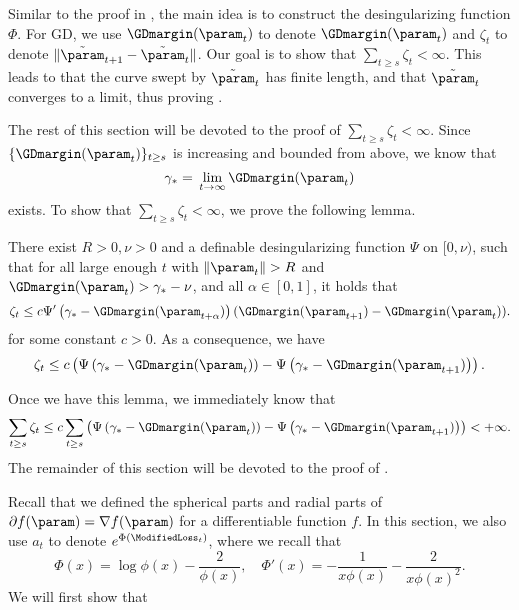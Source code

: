 Similar to the proof in , the main idea is to construct the desingularizing function $\Phi$. For GD, we use $\GDmargin (\param_t)$ to denote $\GDmargin(\param_t)$ and $\zeta_t$ to denote $\|\tilde{\param}_{t+1} - \tilde{\param}_t \|$. Our goal is to show that $\sum_{t\ge s} \zeta_t < \infty$. This leads to that the curve swept by $\tilde{\param}_t$ has finite length, and that $\tilde{\param}_t$ converges to a limit, thus proving .

The rest of this section will be devoted to the proof of $\sum_{t\ge s} \zeta_t < \infty$. Since $\{ \GDmargin(\param_t) \}_{t \ge s}$ is increasing and bounded from above, we know that
\begin{equation*}
    \gamma_* = \, \lim_{t \to \infty} \GDmargin(\param_t)
\end{equation*}
exists. To show that $\sum_{t\ge s} \zeta_t < \infty$, we prove the following lemma. 

\begin{lemma}
\label{lem: Desingularizing function for GD}
There exist $R>0, \nu>0$ and a definable desingularizing function $\Psi$ on $[0, \nu)$, such that for all large enough $t$ with $\left\|\param_t\right\|>R$ and $\GDmargin(\param_t)>\gamma_*-\nu$, and all $\alpha \in [0, 1]$, it holds that
$$
\zeta_t \leq c \Psi^\prime \left(\gamma_*-\GDmargin (\param_{t+\alpha}) \right) (\GDmargin (\param_{t+1}) - \GDmargin (\param_t)). 
$$
for some constant $c>0$. As a consequence, we have
\begin{equation*}
    \zeta_t \leq c \left( \Psi \left(\gamma_*-\GDmargin (\param_t) \right) - \Psi \left(\gamma_*-\GDmargin (\param_{t+1}) \right) \right).
\end{equation*}
\end{lemma}

Once we have this lemma, we immediately know that 
\[
\sum_{t\ge s} \zeta_t \le c \sum_{t\ge s} \left( \Psi \left(\gamma_*-\GDmargin (\param_t) \right) - \Psi \left(\gamma_*-\GDmargin (\param_{t+1}) \right) \right) < + \infty.   
\] 
The remainder of this section will be devoted to the proof of .

Recall that we defined the spherical parts and radial parts of $\partial f(\param) = \nabla f(\param)$ for a differentiable function $f$.  In this section, we also use $a_t$ to denote $e^{\Phi(\ModifiedLoss_t)}$, where we recall that
\begin{equation*}
    \Phi(x) = \log \phi(x) - \frac{2}{\phi(x)}, \quad \Phi'(x) = - \frac{1}{x \phi(x)} - \frac{2}{x \phi(x)^2}.
\end{equation*}
We will first show that


